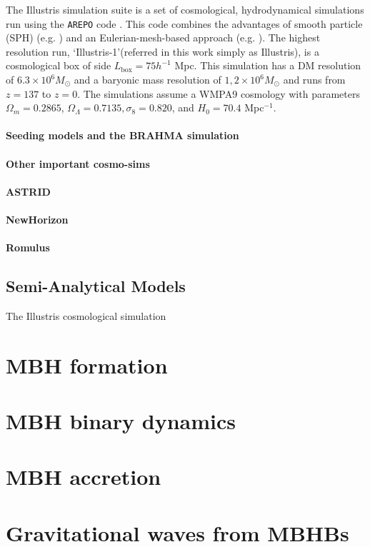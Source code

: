 \documentclass{book}
\begin{document}
The Illustris simulation suite is a set of cosmological, hydrodynamical simulations run using the {\tt AREPO}  code \citep{Springel_2010}. This code combines the advantages of smooth particle (SPH) (e.g. \citep{Gingold97, Lucy1997}) and an Eulerian-mesh-based approach (e.g. \citep{BERGER198964}). The highest resolution run, `Illustris-1'(referred in this work simply as Illustris), is a cosmological box of side $L_{\text{box}} = 75 h^{-1}$ Mpc. This simulation has a DM resolution of $6.3 \times 10^6 M_{\odot}$ and a baryonic mass resolution of $1,2 \times 10^6 M_{\odot}$ and runs from $z=137$ to $z=0$. The simulations assume a WMPA9 cosmology \citep{Hinshaw_2013} with parameters $\Omega_m = 0.2865$, $\Omega_{\Lambda} = 0.7135, \sigma_{8} = 0.820$, and $H_{0} = 70.4$ \kms Mpc$^{-1}$.


\subsubsection{Seeding models and the BRAHMA simulation}


\subsubsection{Other important cosmo-sims}

\subsubsection{ASTRID}
\subsubsection{NewHorizon}

\subsubsection{Romulus}



      
\section{Semi-Analytical Models}

The Illustris cosmological simulation



\chapter{MBH formation}


\chapter{MBH binary dynamics}


\chapter{MBH accretion}

\chapter{Gravitational waves from MBHBs}




\end{document}
